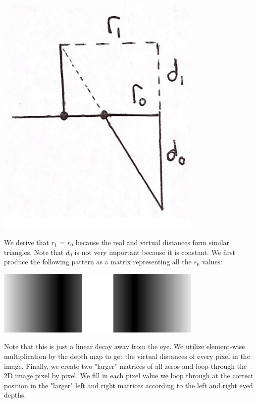\documentclass[12pt]{article}
\begin{document}
\begin{center}
\includegraphics[width=100mm]{dilation_pic.png}
\end{center}

We derive that \(r_{1}\) = \(r_{0}\) because the real and virtual distances form similar triangles. Note that \(d_{0}\) is not very important because it is constant. We first produce the following pattern as a matrix representing all the \(r_{0}\) values:

\begin{center}
\includegraphics[width=100mm]{eye_distances.png}
\end{center}

Note that this is just a linear decay away from the eye. We utilize element-wise multiplication by the depth map to get the virtual distances of every pixel in the image. Finally, we create two "larger" matrices of all zeros and loop through the 2D image pixel by pixel. We fill in each pixel value we loop through at the correct position in the "larger" left and right matrices according to the left and right eyed depths.
\end{document}
